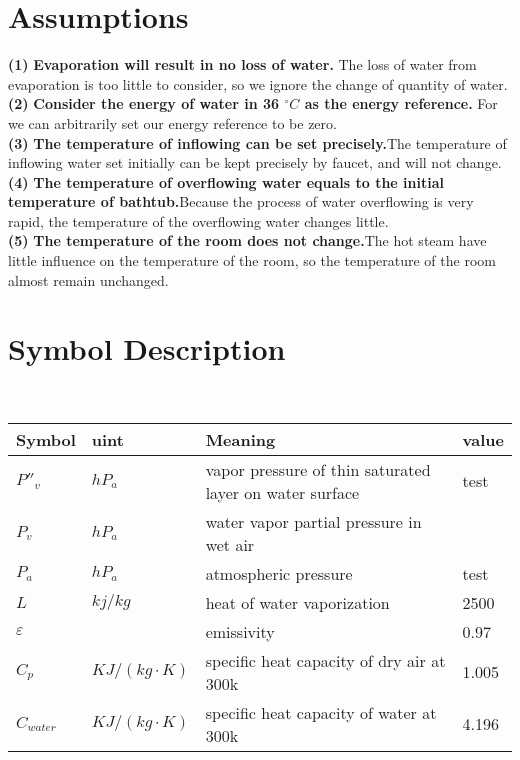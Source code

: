 \documentclass{mcmthesis}
\begin{document}
\section{Assumptions}
\noindent
{\bf (1) } \textbf{Evaporation will result in no loss of water.} The loss of water from evaporation is too little to consider, so we ignore the change of quantity of water.\\
{\bf (2) } \textbf{Consider the energy of water in 36 ${^\circ}C$ as the energy reference.} For we can arbitrarily set our energy reference to be zero.\\
{\bf (3) } \textbf{The temperature of inflowing can be set precisely.}The temperature of inflowing water set initially can be kept precisely by faucet, and will not change.\\
{\bf(4) } \textbf{The temperature of overflowing water equals to the initial temperature of bathtub.}Because the process of water overflowing is very rapid, the temperature of the overflowing water changes little.\\
{\bf(5) } \textbf{The temperature of the room does not change.}The hot steam have little influence on the temperature of the room, so the temperature of the room almost remain unchanged.


\section{Symbol Description}
\begin{table}[H]
        \setlength{\abovecaptionskip}{0pt}
        \setlength{\belowcaptionskip}{0pt}
				\\
        \begin{tabular}{p{2cm}|p{2cm}|p{7.5cm}|p{1.7cm}}
		\hline
		\rowcolor[gray]{0.9}\bf{Symbol}	&\bf{uint}      &\bf{Meaning}&\bf{value}	\\
		\hline
		${P}''_{v}$		& $hP_{a}$		 & vapor pressure of thin saturated layer on water surface  &test\\
		$P_{v}$		& $hP_{a}$		 & water vapor partial pressure in wet air\\
		$P_{a}$		& $hP_{a}$		 & atmospheric pressure  &test\\
		$L$		& $kj/kg$		 & heat of water vaporization&2500\\
		$\varepsilon$		& 		 & emissivity&0.97\\
		$C_{p}$		& $KJ/(kg\cdot K)$		 & specific heat capacity of dry air at 300k &1.005\\
		$C_{water}$		& $KJ/(kg\cdot K)$		 & specific heat capacity of water at 300k &4.196\\

		\hline
		\end{tabular}
	\end{table}
\end{document}
